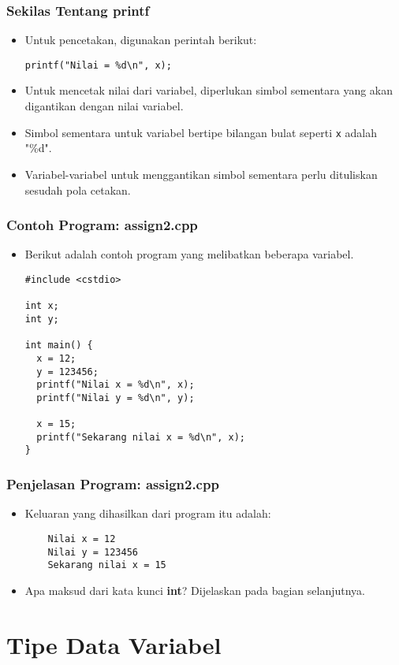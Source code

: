 \begin{frame}[fragile]
\frametitle{Sekilas Tentang printf}
\begin{itemize}
  \item Untuk pencetakan, digunakan perintah berikut:
\begin{lstlisting}
printf("Nilai = %d\n", x);
\end{lstlisting}
  \item Untuk mencetak nilai dari variabel, diperlukan simbol sementara yang akan digantikan dengan nilai variabel.
  \item Simbol sementara untuk variabel bertipe bilangan bulat seperti \texttt{x} adalah "\%d".
  \item Variabel-variabel untuk menggantikan simbol sementara perlu dituliskan sesudah pola cetakan.
\end{itemize}
\end{frame}

\begin{frame}[fragile]
\frametitle{Contoh Program: assign2.cpp}
\begin{itemize}
  \item Berikut adalah contoh program yang melibatkan beberapa variabel.
\begin{lstlisting}
#include <cstdio>

int x;
int y;

int main() {
  x = 12;
  y = 123456;
  printf("Nilai x = %d\n", x);
  printf("Nilai y = %d\n", y);

  x = 15;
  printf("Sekarang nilai x = %d\n", x);
}
\end{lstlisting}
\end{itemize}
\end{frame}

\begin{frame}[fragile]
\frametitle{Penjelasan Program: assign2.cpp}
\begin{itemize}
  \item Keluaran yang dihasilkan dari program itu adalah:
  \begin{lstlisting}
    Nilai x = 12
    Nilai y = 123456
    Sekarang nilai x = 15
  \end{lstlisting}
  \item Apa maksud dari kata kunci \textbf{int}? Dijelaskan pada bagian selanjutnya.
\end{itemize}
\end{frame}

\section{Tipe Data Variabel}
\frame{\sectionpage}

